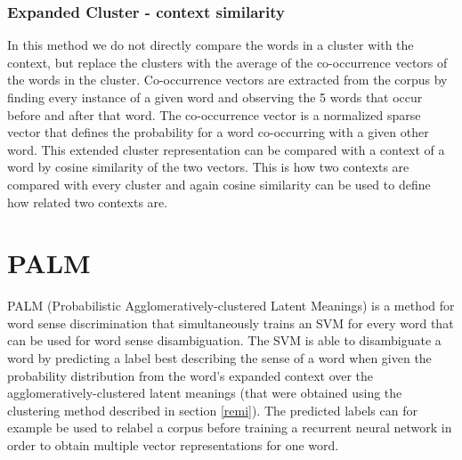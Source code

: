 \documentclass[11pt]{article}
\begin{document}
\subsubsection{Expanded Cluster - context similarity}
In this method we do not directly compare the words in a cluster with the context, but replace the clusters with the average of the co-occurrence vectors of the words in the cluster. Co-occurrence vectors are extracted from the corpus by finding every instance of a given word and observing the 5 words that occur before and after that word. The co-occurrence vector is a normalized sparse vector that defines the probability for a word co-occurring with a given other word. This extended cluster representation can be compared with a context of a word by cosine similarity of the two vectors. This is how two contexts are compared with every cluster and again cosine similarity can be used to define how related two contexts are.

\section{PALM}
PALM (Probabilistic Agglomeratively-clustered Latent Meanings) is a method for word sense discrimination that simultaneously trains an SVM for every word that can be used for word sense disambiguation. The SVM is able to disambiguate a word by predicting a label best describing the sense of a word when given the probability distribution from the word's expanded context over the agglomeratively-clustered latent meanings (that were obtained using the clustering method described in section \ref{remi}). The predicted labels can for example be used to relabel a corpus before training a recurrent neural network in order to obtain multiple vector representations for one word. 
\end{document}
